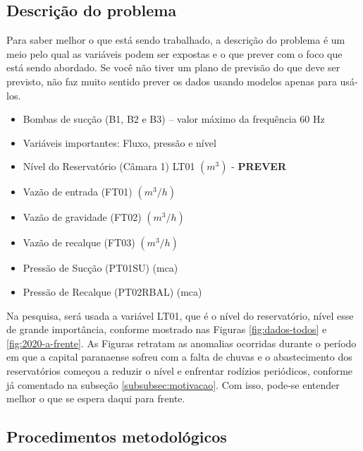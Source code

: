 \subsection{Descri\c c\~ao do problema} \label{subsec:descricao}

Para saber melhor o que está sendo trabalhado, a descrição do problema é um meio pelo qual as variáveis podem ser expostas e o que prever com o foco que está sendo abordado.
Se você não tiver um plano de previsão do que deve ser previsto, não faz muito sentido prever os dados usando modelos apenas para usá-los.

\begin{itemize}
	\item Bombas de sucção (B1, B2 e B3) – valor máximo da frequência 60 Hz
	
	\item[] Variáveis importantes: Fluxo, pressão e nível
	
	\item Nível do Reservatório (Câmara 1) LT01 $ (m^3) $ - \textbf{PREVER}
	
	\item Vazão de entrada (FT01) $ (m^3/h) $
	
	\item Vazão de gravidade (FT02) $ (m^3/h) $
	
	\item Vazão de recalque (FT03) $ (m^3/h) $
	
	\item Pressão de Sucção (PT01SU) (mca)
	
	\item Pressão de Recalque (PT02RBAL) (mca)
\end{itemize}

Na pesquisa, será usada a variável LT01, que é o nível do reservatório, nível esse de grande importância, conforme mostrado nas Figuras \ref{fig:dados-todos} e \ref{fig:2020-a-frente}. As Figuras retratam as anomalias ocorridas durante o período em que a capital paranaense sofreu com a falta de chuvas e o abastecimento dos reservatórios começou a reduzir o nível e enfrentar rodízios periódicos, conforme já comentado na subseção \ref{subsubsec:motivacao}. Com isso, pode-se entender melhor o que se espera daqui para frente.

\subsection{Procedimentos metodol{\'o}gicos} \label{subsec:metod}

